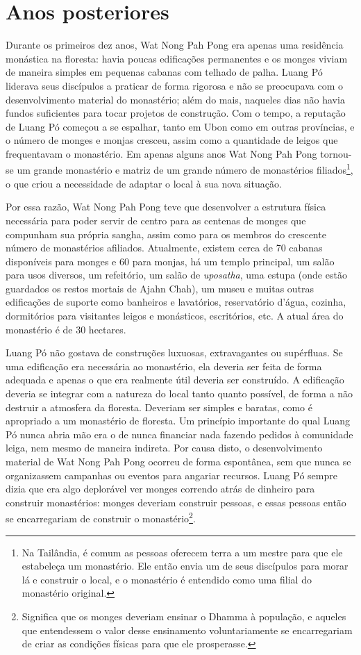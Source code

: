 \chapter{Anos posteriores}

Durante os primeiros dez anos, Wat Nong Pah Pong era apenas uma
residência monástica na floresta: havia poucas edificações permanentes e
os monges viviam de maneira simples em pequenas cabanas com telhado de
palha. Luang Pó liderava seus discípulos a praticar de forma rigorosa e
não se preocupava com o desenvolvimento material do monastério; além do
mais, naqueles dias não havia fundos suficientes para tocar projetos de
construção. Com o tempo, a reputação de Luang Pó começou a se espalhar,
tanto em Ubon como em outras províncias, e o número de monges e monjas
cresceu, assim como a quantidade de leigos que frequentavam o
monastério. Em apenas alguns anos Wat Nong Pah Pong tornou-se um grande
monastério e matriz de um grande número de monastérios
filiados\footnote{Na Tailândia, é comum as pessoas oferecem terra a um
  mestre para que ele estabeleça um monastério. Ele então envia um de
  seus discípulos para morar lá e construir o local, e o monastério é
  entendido como uma filial do monastério original.}, o que criou a
necessidade de adaptar o local à sua nova situação.

Por essa razão, Wat Nong Pah Pong teve que desenvolver a estrutura
física necessária para poder servir de centro para as centenas de monges
que compunham sua própria sangha, assim como para os membros do
crescente número de monastérios afiliados. Atualmente, existem cerca de
70 cabanas disponíveis para monges e 60 para monjas, há um templo
principal, um salão para usos diversos, um refeitório, um salão de
\emph{uposatha}, uma estupa (onde estão guardados os restos mortais de
Ajahn Chah), um museu e muitas outras edificações de suporte como
banheiros e lavatórios, reservatório d'água, cozinha, dormitórios para
visitantes leigos e monásticos, escritórios, etc. A atual área do
monastério é de 30 hectares.

Luang Pó não gostava de construções luxuosas, extravagantes ou
supérfluas. Se uma edificação era necessária ao monastério, ela deveria
ser feita de forma adequada e apenas o que era realmente útil deveria
ser construído. A edificação deveria se integrar com a natureza do local
tanto quanto possível, de forma a não destruir a atmosfera da floresta.
Deveriam ser simples e baratas, como é apropriado a um monastério de
floresta. Um princípio importante do qual Luang Pó nunca abria mão era o
de nunca financiar nada fazendo pedidos à comunidade leiga, nem mesmo de
maneira indireta. Por causa disto, o desenvolvimento material de Wat
Nong Pah Pong ocorreu de forma espontânea, sem que nunca se organizassem
campanhas ou eventos para angariar recursos. Luang Pó sempre dizia que
era algo deplorável ver monges correndo atrás de dinheiro para construir
monastérios: monges deveriam construir pessoas, e essas pessoas então se
encarregariam de construir o monastério\footnote{Significa que os monges
  deveriam ensinar o Dhamma à população, e aqueles que entendessem o
  valor desse ensinamento voluntariamente se encarregariam de criar as
  condições físicas para que ele prosperasse.}.

